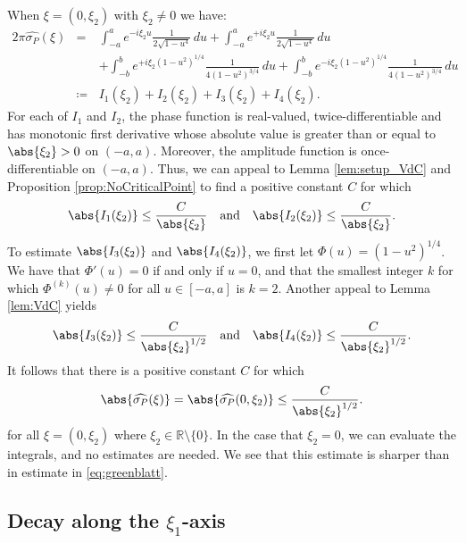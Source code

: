 \documentclass[11pt, letter]{book}
\newcommand{\f}[2]{\frac{#1}{#2}}
\begin{document}
When $\xi = (0,\xi_2)$ with $\xi_2 \neq 0$ we have:
\begin{eqnarray*}
    2\pi \widehat{\sigma_P}(\xi) 
    &=& \int_{-a}^a  e^{-i \xi_2 u} \f{1}{2\sqrt{1-u^4}}\,du  + \int_{-a}^a  e^{+i \xi_2 u} \f{1}{2\sqrt{1-u^4}}\,du \\
    &\quad& + \int_{-b}^b e^{+i \xi_2 (1-u^2)^{1/4}} \f{1}{4(1 - u^2)^{3/4}} \,du + \int_{-b}^b e^{-i \xi_2 (1-u^2)^{1/4}} \f{1}{4(1 - u^2)^{3/4}}\,du \\
    &\coloneqq& I_1(\xi_2) + I_2(\xi_2) + I_3(\xi_2) + I_4(\xi_2).
\end{eqnarray*}
For each of $I_1$ and $I_2$, the phase function is real-valued, twice-differentiable and has monotonic first derivative whose absolute value is greater than or equal to $\abs{\xi_2} > 0$ on $(-a,a)$. Moreover, the amplitude function is once-differentiable on $(-a,a)$. Thus, we can appeal to Lemma \ref{lem:setup_VdC} and Proposition \ref{prop:NoCriticalPoint} to find a positive constant $C$ for which
\begin{equation*}
    \abs{I_1(\xi_2)} \leq \f{C}{\abs{\xi_2}} \quad \mbox{and} \quad \abs{I_2(\xi_2)} \leq \f{C}{\abs{\xi_2}}.
\end{equation*}
To estimate $\abs{I_3(\xi_2)}$ and $\abs{I_4(\xi_2)}$, we first let $\Phi(u) = (1-u^2)^{1/4}$. We have that $\Phi'(u) = 0$ if and only if $u=0$, and that the smallest integer $k$ for which $\Phi^{(k)}(u) \neq 0$ for all $u\in [-a,a]$ is $k=2$. Another appeal to Lemma \ref{lem:VdC} yields
\begin{equation*}
    \abs{I_3(\xi_2)} \leq \f{C}{\abs{\xi_2}^{1/2}} \quad \mbox{and} \quad \abs{I_4(\xi_2)} \leq \f{C}{\abs{\xi_2}^{1/2}}.
\end{equation*}
It follows that there is a positive constant $C$ for which
\begin{equation*}
    \abs{\widehat{\sigma_P}(\xi) }=\abs{\widehat{\sigma_P}(0,\xi_2) } \leq \f{C}{\abs{\xi_2}^{1/2}}.
\end{equation*}
for all $\xi=(0,\xi_2)$ where $\xi_2\in\mathbb{R}\setminus \{ 0 \}$. In the case that $\xi_2 = 0$, we can evaluate the integrals, and no estimates are needed. We see that this estimate is sharper than in estimate in \eqref{eq:greenblatt}.




\subsection{Decay along the $\xi_1$-axis}
\end{document}

